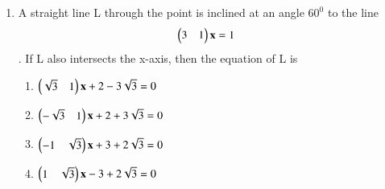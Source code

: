 \begin{enumerate}
    \begin{enumerate}
     \item  {}
     \item  {}
     \item  {}
     \item  {}
     \end{enumerate}
    \item A straight line L through the point  is inclined at an angle $60^0$ to the line\begin{align} \begin{pmatrix}3 & 1\end{pmatrix} \mathbf {x} &= 1\end{align}. If L also intersects the x-axis, then the equation of L is
    \begin{enumerate}
     \item  $\begin{pmatrix}\sqrt3 & 1\end{pmatrix} \mathbf {x} + 2 - 3\sqrt3=0$
     \item  $\begin{pmatrix}-\sqrt3 & 1\end{pmatrix} \mathbf{x} + 2 + 3\sqrt3=0$
     \item  $\begin{pmatrix}-1 & \sqrt3 \end{pmatrix} \mathbf x + 3 + 2\sqrt3 =0$
     \item  $\begin{pmatrix}1 & \sqrt3 \end{pmatrix} \mathbf x - 3 + 2\sqrt3 =0$
     \end{enumerate}
\end{enumerate}

